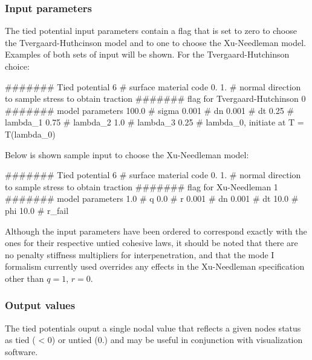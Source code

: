 \subsubsection{Input parameters}
The tied potential input parameters contain a flag that is set to
zero to choose the Tvergaard-Huthcinson model and to one to choose
the Xu-Needleman model. Examples of both sets of input will be shown.
For the Tvergaard-Hutchinson choice:
\begin{inputfile}
####### Tied potential
6     # surface material code
0. 1. # normal direction to sample stress to obtain traction
####### flag for Tvergaard-Hutchinson
0
####### model parameters
100.0 # sigma
0.001 # dn
0.001 # dt
0.25  # lambda_1
0.75  # lambda_2
1.0   # lambda_3
0.25  # lambda_0, initiate at T = T(lambda_0)
\end{inputfile}

Below is shown sample input to choose the Xu-Needleman model:
\begin{inputfile}
####### Tied potential
6     # surface material code
0. 1. # normal direction to sample stress to obtain traction
####### flag for Xu-Needleman
1
####### model parameters
1.0   # q
0.0   # r 
0.001 # dn
0.001 # dt
10.0  # phi
10.0  # r_fail
\end{inputfile}

Although the input parameters have been ordered to correspond exactly
with the ones for their respective untied cohesive laws, it should be
noted that there are no penalty stiffness multipliers for interpenetration,
and that the mode I formalism currently used overrides any effects in
the Xu-Needleman specification other than $q = 1$, $r = 0$. 

\subsubsection{Output values}
The tied potentials ouput a single nodal value that reflects a given
nodes status as tied ( < 0) or untied (0.) and may be useful in conjunction
with visualization software. 

